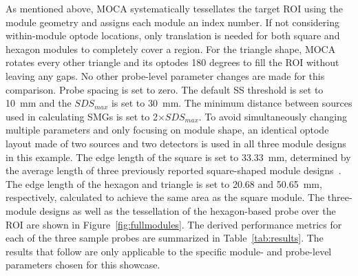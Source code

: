As mentioned above, \ac{MOCA} systematically tessellates the target \ac{ROI} using the module geometry and assigns each module an index number. If not considering within-module optode locations, only translation is needed for both square and hexagon modules to completely cover a region. For the triangle shape, \ac{MOCA} rotates every other triangle and its optodes 180 degrees to fill the \ac{ROI} without leaving any gaps. No other probe-level parameter changes are made for this comparison. Probe spacing is set to zero. The default \ac{SS} threshold is set to 10~mm and the $SDS_{max}$ is set to 30~mm. The minimum distance between sources used in calculating \ac{SMG}s is set to 2$\times SDS_{max}$. To avoid simultaneously changing multiple parameters and only focusing on module shape, an identical optode layout made of two sources and two detectors is used in all three module designs in this example. The edge length of the square is set to 33.33~mm, determined by the average length of three previously reported square-shaped module designs~\cite{Chitnis2016, Bci2017, Zimmermann2013}. The edge length of the hexagon and triangle is set to 20.68 and 50.65~mm, respectively, calculated to achieve the same area as the square module. The three-module designs as well as the tessellation of the hexagon-based probe over the \ac{ROI} are shown in Figure~\ref{fig:fullmodules}. The derived performance metrics for each of the three sample probes are summarized in Table~\ref{tab:results}. The results that follow are only applicable to the specific module- and probe-level parameters chosen for this showcase.

